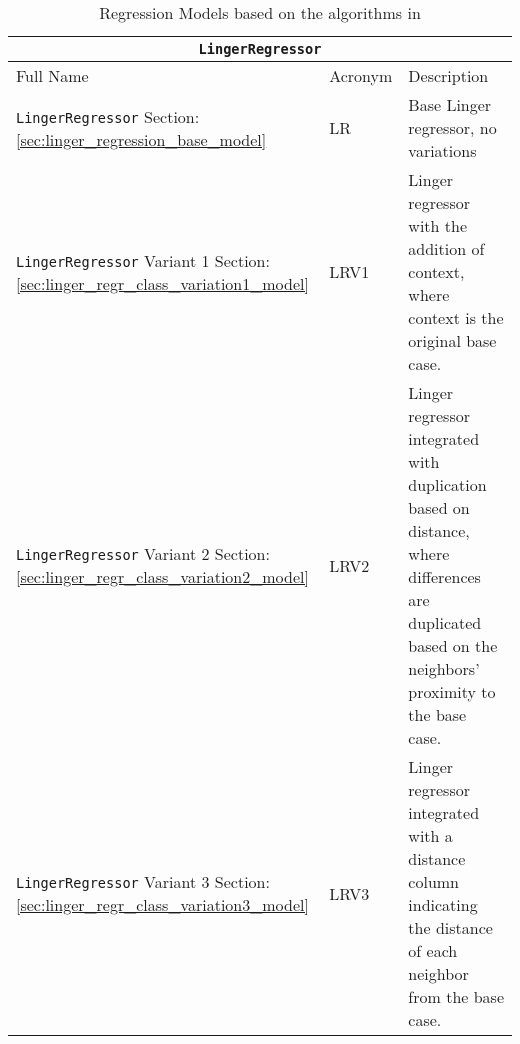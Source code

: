 \documentclass[a4paper, 12pt]{report}
\begin{document}
\begin{table}[H]
    \centering
    \begin{tabular}{ |p{6cm}|p{2cm}|p{9cm}| }
        \hline
        \multicolumn{3}{|c|}{\texttt{LingerRegressor}} \\
        \hline
        Full Name & Acronym & Description \\
        \hline
        \texttt{LingerRegressor} Section: \ref{sec:linger_regression_base_model} & LR & Base Linger regressor, no variations \\
        \hline
        \texttt{LingerRegressor} Variant 1 Section: \ref{sec:linger_regr_class_variation1_model} & LRV1 & Linger regressor with the addition of context, where context is the original base case. \\
        \hline
        \texttt{LingerRegressor} Variant 2 Section: \ref{sec:linger_regr_class_variation2_model} & LRV2 & Linger regressor integrated with duplication based on distance, where differences are duplicated based on the neighbors' proximity to the base case. \\
        \hline
        \texttt{LingerRegressor} Variant 3 Section: \ref{sec:linger_regr_class_variation3_model} & LRV3 & Linger regressor integrated with a distance column indicating the distance of each neighbor from the base case. \\
        \hline
        \hline
    \end{tabular}
    \caption{Regression Models based on the algorithms in \cite{learningFromDifferences2022}}
    \label{tab:LingerRegressor_models}
\end{table}
\end{document}
